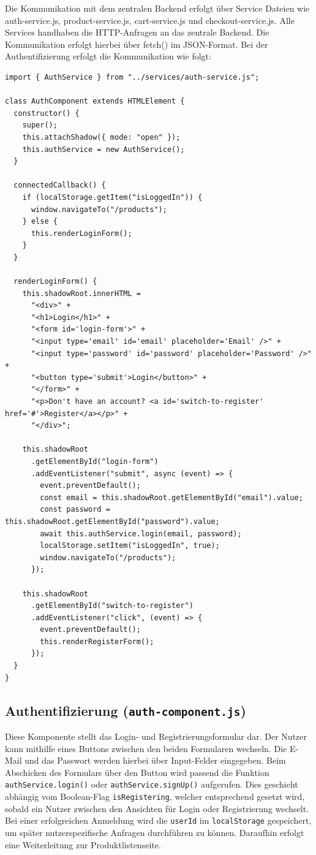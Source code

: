 \documentclass[oneside]{ausarbeitung}
\begin{document}
Die Kommunikation mit dem zentralen Backend erfolgt über Service Dateien wie auth-service.js, product-service.js, cart-service.js und checkout-service.js. 
Alle Services handhaben die HTTP-Anfragen an das zentrale Backend. Die Kommunikation erfolgt hierbei über fetch() im JSON-Format. 
Bei der Authentifizierung erfolgt die Kommunikation wie folgt: 
\begin{lstlisting}[caption={Login-Komponente zur Anmeldung}, label={lst:auth-component}]
import { AuthService } from "../services/auth-service.js";

class AuthComponent extends HTMLElement {
  constructor() {
    super();
    this.attachShadow({ mode: "open" });
    this.authService = new AuthService();
  }

  connectedCallback() {
    if (localStorage.getItem("isLoggedIn")) {
      window.navigateTo("/products");
    } else {
      this.renderLoginForm();
    }
  }

  renderLoginForm() {
    this.shadowRoot.innerHTML =
      "<div>" +
      "<h1>Login</h1>" +
      "<form id='login-form'>" +
      "<input type='email' id='email' placeholder='Email' />" +
      "<input type='password' id='password' placeholder='Password' />" +
      "<button type='submit'>Login</button>" +
      "</form>" +
      "<p>Don't have an account? <a id='switch-to-register' href='#'>Register</a></p>" +
      "</div>";

    this.shadowRoot
      .getElementById("login-form")
      .addEventListener("submit", async (event) => {
        event.preventDefault();
        const email = this.shadowRoot.getElementById("email").value;
        const password = this.shadowRoot.getElementById("password").value;
        await this.authService.login(email, password);
        localStorage.setItem("isLoggedIn", true);
        window.navigateTo("/products");
      });

    this.shadowRoot
      .getElementById("switch-to-register")
      .addEventListener("click", (event) => {
        event.preventDefault();
        this.renderRegisterForm();
      });
  }
}
\end{lstlisting}

\subsection{Authentifizierung (\texttt{auth-component.js})}

Diese Komponente stellt das Login- und Registrierungsformular dar. Der Nutzer kann mithilfe eines Buttons zwischen den beiden Formularen wechseln. Die E-Mail und das Passwort werden hierbei über Input-Felder eingegeben. Beim Abschicken des Formulars über den Button wird passend die Funktion \texttt{authService.login()} oder \texttt{authService.signUp()} aufgerufen. Dies geschieht abhängig vom Boolean-Flag \texttt{isRegistering}, welcher entsprechend gesetzt wird, sobald ein Nutzer zwischen den Ansichten für Login oder Registrierung wechselt. Bei einer erfolgreichen Anmeldung wird die \texttt{userId} im \texttt{localStorage} gespeichert, um später nutzerspezifische Anfragen durchführen zu können. Daraufhin erfolgt eine Weiterleitung zur Produktlistenseite.
\end{document}
